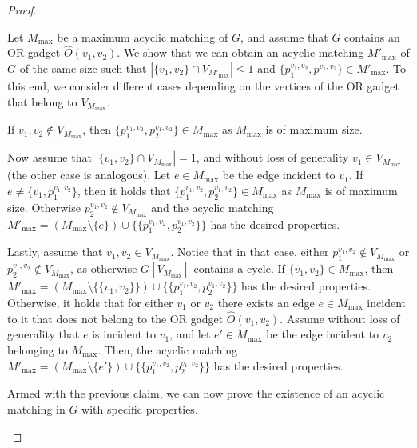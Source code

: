 \begin{proof}
\begin{nestedproof}
            \begin{claimproof}
                Let $M_{\max}$ be a maximum acyclic matching of $G$, and assume that $G$ contains an OR gadget $\hat{O}(v_1,v_2)$.
                We show that we can obtain an acyclic matching $M'_{\max}$ of $G$ of the same size
                such that $|\{v_1,v_2\} \cap V_{M'_{\max}}| \le 1$ and $\{p^{v_1,v_2}_1,p^{v_1,v_2}\} \in M'_{\max}$.
                To this end, we consider different cases depending on the vertices of the OR gadget that belong to $V_{M_{\max}}$.

                If $v_1,v_2 \notin V_{M_{\max}}$, then $\{p^{v_1,v_2}_1,p^{v_1,v_2}_2\} \in M_{\max}$ as
                $M_{\max}$ is of maximum size.

                Now assume that $|\{v_1,v_2\} \cap V_{M_{\max}}| = 1$, and without loss of generality $v_1 \in V_{M_{\max}}$ (the other case is analogous).
                Let $e \in M_{\max}$ be the edge incident to $v_1$.
                If $e \neq \{v_1,p^{v_1,v_2}_1\}$, then it holds that $\{p^{v_1,v_2}_1,p^{v_1,v_2}_2\} \in M_{\max}$ as $M_{\max}$ is of maximum size.
                Otherwise $p^{v_1,v_2}_2 \notin V_{M_{\max}}$ and the acyclic matching $M'_{\max} = (M_{\max} \setminus \{e\}) \cup \{\{p^{v_1,v_2}_1,p^{v_1,v_2}_2\}\}$ has the desired properties.

                Lastly, assume that $v_1,v_2 \in V_{M_{\max}}$.
                Notice that in that case, either $p^{v_1,v_2}_1 \notin V_{M_{\max}}$ or $p^{v_1,v_2}_2 \notin V_{M_{\max}}$, as otherwise $G[V_{M_{\max}}]$
                contains a cycle.
                If $\{v_1,v_2\} \in M_{\max}$, then $M'_{\max} = (M_{\max} \setminus \{\{v_1,v_2\}\}) \cup \{\{p^{v_1,v_2}_1,p^{v_1,v_2}_2\}\}$ has the desired properties.
                Otherwise, it holds that for either $v_1$ or $v_2$ there exists an edge $e \in M_{\max}$ incident to it
                that does not belong to the OR gadget $\hat{O}(v_1,v_2)$.
                Assume without loss of generality that $e$ is incident to $v_1$, and let $e' \in M_{\max}$ be the edge incident to $v_2$ belonging to $M_{\max}$.
                Then, the acyclic matching $M'_{\max} = (M_{\max} \setminus \{e'\}) \cup \{\{p^{v_1,v_2}_1,p^{v_1,v_2}_2\}\}$ has the desired properties.
            \end{claimproof}

            Armed with the previous claim, we can now prove the existence of an acyclic matching in $G$ with specific properties.


\end{nestedproof}
\end{proof}
